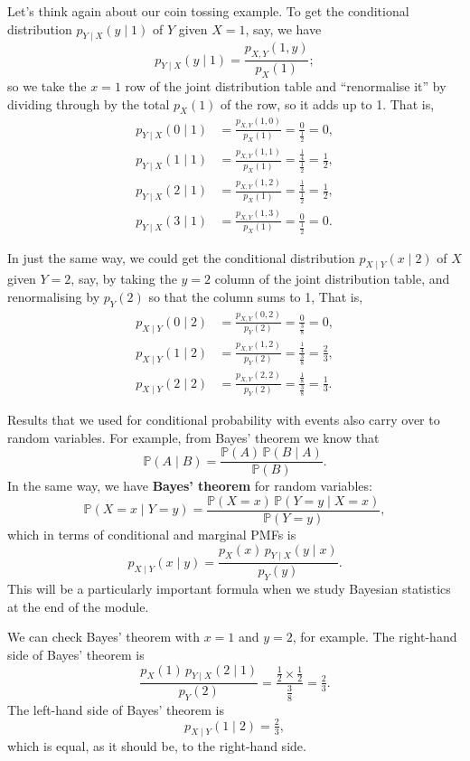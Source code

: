 \documentclass[
  a4paper,
]{book}
\theoremstyle{definition}
\theoremstyle{definition}
\theoremstyle{definition}
\theoremstyle{definition}
\theoremstyle{remark}
\begin{document}
Let's think again about our coin tossing example. To get the conditional distribution \(p_{Y \mid X} (y \mid 1)\) of \(Y\) given \(X = 1\), say, we have
\[ p_{Y \mid X}(y \mid 1) = \frac{p_{X,Y}(1,y)}{p_X(1)} ;   \]
so we take the \(x = 1\) row of the joint distribution table and ``renormalise it'' by dividing through by the total \(p_X(1)\) of the row, so it adds up to 1. That is,
\begin{align*}
  p_{Y \mid X} (0 \mid 1) &= \frac{p_{X,Y}(1, 0)}{p_X(1)} = \frac{0}{\frac12} = 0 , \\
  p_{Y \mid X} (1 \mid 1) &= \frac{p_{X,Y}(1, 1)}{p_X(1)} = \frac{\frac14}{\frac12} = \tfrac12 , \\
  p_{Y \mid X} (2 \mid 1) &= \frac{p_{X,Y}(1, 2)}{p_X(1)} = \frac{\frac14}{\frac12} = \tfrac12 , \\
  p_{Y \mid X} (3 \mid 1) &= \frac{p_{X,Y}(1, 3)}{p_X(1)} = \frac{0}{\frac12} = 0 .
\end{align*}

In just the same way, we could get the conditional distribution \(p_{X \mid Y} (x \mid 2)\) of \(X\) given \(Y = 2\), say, by taking the \(y = 2\) column of the joint distribution table, and renormalising by \(p_Y(2)\) so that the column sums to 1, That is,
\begin{align*}
  p_{X \mid Y} (0 \mid 2) &= \frac{p_{X,Y}(0,2)}{p_Y(2)} = \frac{0}{\frac38} = 0 , \\
  p_{X \mid Y} (1 \mid 2) &= \frac{p_{X,Y}(1,2)}{p_Y(2)} = \frac{\frac14}{\frac38} = \tfrac23 , \\
  p_{X \mid Y} (2 \mid 2) &= \frac{p_{X,Y}(2,2)}{p_Y(2)} = \frac{\frac18}{\frac38} = \tfrac13 .
\end{align*}

Results that we used for conditional probability with events also carry over to random variables. For example, from Bayes' theorem we know that
\[ \mathbb P(A \mid B) = \frac{ \mathbb P(A) \, \mathbb P(B \mid A)}{\mathbb P(B)} . \]
In the same way, we have \textbf{Bayes' theorem} for random variables:
\[ \mathbb P(X = x \mid Y = y) = \frac{ \mathbb P(X = x) \, \mathbb P(Y = y \mid X = x)}{\mathbb P(Y = y)} , \]
which in terms of conditional and marginal PMFs is
\[ p_{X \mid Y}(x \mid y) = \frac{p_X(x) \, p_{Y \mid X}(y \mid x)}{p_Y(y)} . \]
This will be a particularly important formula when we study Bayesian statistics at the end of the module.

We can check Bayes' theorem with \(x = 1\) and \(y = 2\), for example.
The right-hand side of Bayes' theorem is
\[ \frac{p_X(1) \, p_{Y \mid X}(2 \mid 1)}{p_Y(2)} = \frac{\frac12 \times \frac12}{\frac38} = \tfrac{2}{3} .   \]
The left-hand side of Bayes' theorem is
\[ p_{X \mid Y}(1 \mid 2) = \tfrac23 , \]
which is equal, as it should be, to the right-hand side.
\end{document}
